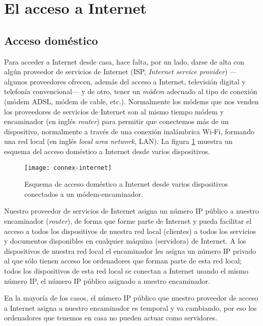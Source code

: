 \section{El acceso a Internet} \label{ss:adaI} 

\subsection{Acceso doméstico} Para acceder a Internet desde casa, hace falta, por un lado, darse de alta con algún proveedor de servicios de Internet (ISP, \emph{Internet service provider}) ---algunos proveedores ofrecen, además del acceso a Internet, televisión digital y telefonía convencional--- y de otro, tener un \emph{módem} adecuado al tipo de conexión (módem ADSL, módem de cable, etc.). Normalmente los módems que nos venden los proveedores de servicios de Internet son al mismo tiempo módem y encaminador (en inglés \emph{router}) para permitir que conectemos más de un dispositivo, normalmente a través de una conexión inalámbrica Wi-Fi, formando una red local (en inglés \emph{local area network}, LAN). La figura \ref{fg:accesinternet} muestra un esquema del acceso doméstico a Internet desde varios dispositivos. 

\begin{figure} \centering

\texttt{[image: connex-internet]} \caption{Esquema de acceso doméstico a Internet desde varios dispositivos conectados a un módem-encaminador.} \label{fg:accesinternet} \end{figure} 

Nuestro proveedor de servicios de Internet asigna un número IP público a nuestro encaminador (\emph{router}), de forma que forme parte de Internet y pueda facilitar el acceso a todos los dispositivos de nuestra red local (clientes) a todos los servicios y documentos disponibles en cualquier máquina (servidora) de Internet. A los dispositivos de nuestra red local el encaminador les asigna un número IP privado al que sólo tienen acceso los ordenadores que forman parte de esta red local; todos los dispositivos de esta red local se conectan a Internet usando el mismo número IP, el número IP público asignado a nuestro encaminador. 

En la mayoría de los casos, el número IP público que nuestro proveedor de acceso a Internet asigna a nuestro encaminador es temporal y va cambiando, por eso los ordenadores que tenemos en casa no pueden actuar como servidores. 

